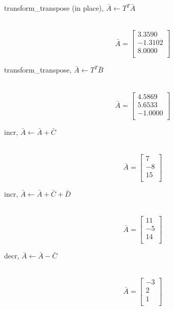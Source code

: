 \begin{description}
  \item[transform\_transpose (in place),  $\bar{A} \leftarrow T^T\bar{A}$]\ \newline
   \begin{equation}\nonumber
   \bar{A} = \left[
   \begin{array}{r}
       3.3590  \\
      -1.3102  \\
       8.0000  \\
   \end{array}\right]
   \end{equation}

  \item[transform\_transpose,  $\bar{A} \leftarrow T^T\bar{B}$]\ \newline
   \begin{equation}\nonumber
   \bar{A} = \left[
   \begin{array}{r}
       4.5869  \\
       5.6533  \\
      -1.0000  \\
   \end{array}\right]
   \end{equation}

  \item[incr, $\bar{A} \leftarrow \bar{A}+\bar{C}$]\ \newline
   \begin{equation}\nonumber
   \bar{A} = \left[
   \begin{array}{r}
       7  \\
      -8  \\
       15 \\
   \end{array}\right]
   \end{equation}

  \item[incr, $\bar{A} \leftarrow \bar{A}+\bar{C}+\bar{D}$]\ \newline
   \begin{equation}\nonumber
   \bar{A} = \left[
   \begin{array}{r}
      11  \\
      -5  \\
      14 \\
   \end{array}\right]
   \end{equation}

  \item[decr, $\bar{A} \leftarrow \bar{A}-\bar{C}$]\ \newline
   \begin{equation}\nonumber
   \bar{A} = \left[
   \begin{array}{r}
      -3  \\
       2  \\
       1 \\
   \end{array}\right]
   \end{equation}


\end{description}
